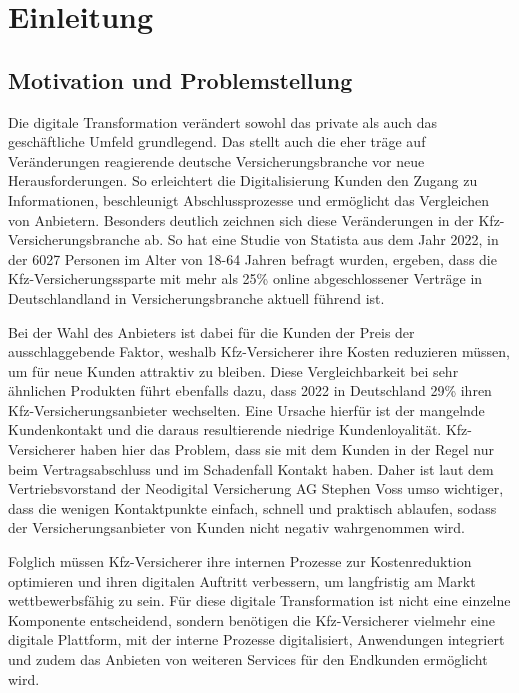 \chapter{Einleitung}

\section{Motivation und Problemstellung}

Die digitale Transformation verändert sowohl das private als auch das geschäftliche Umfeld grundlegend. Das stellt auch die eher träge auf Veränderungen reagierende deutsche Versicherungsbranche vor neue Herausforderungen. So erleichtert die Digitalisierung Kunden den Zugang zu Informationen, beschleunigt Abschlussprozesse und ermöglicht das Vergleichen von Anbietern. Besonders deutlich zeichnen sich diese Veränderungen in der Kfz-Versicherungsbranche ab. So hat eine Studie von Statista aus dem Jahr 2022, in der 6027 Personen im Alter von 18-64 Jahren befragt wurden, ergeben, dass die Kfz-Versicherungssparte mit mehr als 25\% online abgeschlossener Verträge in Deutschlandland in Versicherungsbranche aktuell führend ist.

Bei der Wahl des Anbieters ist dabei für die Kunden der Preis der ausschlaggebende Faktor, weshalb Kfz-Versicherer ihre Kosten reduzieren müssen, um für neue Kunden attraktiv zu bleiben. Diese Vergleichbarkeit bei sehr ähnlichen Produkten führt ebenfalls dazu, dass 2022 in Deutschland 29\% ihren Kfz-Versicherungsanbieter wechselten. Eine Ursache hierfür ist der mangelnde Kundenkontakt und die daraus resultierende niedrige Kundenloyalität. Kfz-Versicherer haben hier das Problem, dass sie mit dem Kunden in der Regel nur beim Vertragsabschluss und im Schadenfall Kontakt haben.  Daher ist laut dem Vertriebsvorstand der Neodigital Versicherung AG Stephen Voss umso wichtiger, dass die wenigen Kontaktpunkte einfach, schnell und praktisch ablaufen, sodass der Versicherungsanbieter von Kunden nicht negativ wahrgenommen wird. 

Folglich müssen Kfz-Versicherer ihre internen Prozesse zur Kostenreduktion optimieren und ihren digitalen Auftritt verbessern, um  langfristig am Markt wettbewerbsfähig zu sein. Für diese digitale Transformation ist nicht eine einzelne Komponente entscheidend, sondern benötigen die Kfz-Versicherer vielmehr eine digitale Plattform, mit der interne Prozesse digitalisiert, Anwendungen integriert und zudem das Anbieten von weiteren Services für den Endkunden ermöglicht wird.

